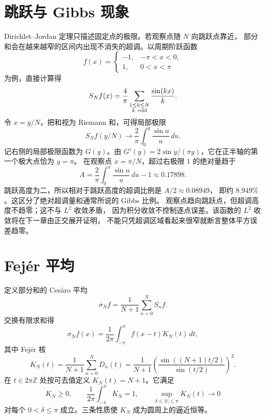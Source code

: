 \section{跳跃与 Gibbs 现象}

Dirichlet--Jordan 定理只描述固定点的极限。若观察点随 \(N\) 向跳跃点靠近，
部分和会在越来越窄的区间内出现不消失的超调。以周期阶跃函数
\[
 f(x)=\begin{cases}-1,&-\pi<x<0,\\1,&0<x<\pi\end{cases}
\]
为例，直接计算得
\[
 S_Nf(x)=\frac4\pi\sum_{\substack{1\le k\le N\\k\ {\rm odd}}}
 \frac{\sin(kx)}k.
\]
令 \(x=y/N\)，把和视为 Riemann 和，可得局部极限
\[
 S_Nf(y/N)\longrightarrow \frac2\pi\int_0^y\frac{\sin u}{u}\,du.
\]
记右侧的局部极限函数为 \(G(y)\)。由
\(G'(y)=2\sin y/(\pi y)\)，它在正半轴的第一个极大点恰为 \(y=\pi\)。
在观察点 \(x=\pi/N\)，超过右极限 \(1\) 的绝对量趋于
\[
 A=\frac2\pi\int_0^\pi\frac{\sin u}{u}\,du-1\approx0.17898.
\]
跳跃高度为二，所以相对于跳跃高度的超调比例是 \(A/2\approx0.08949\)，
即约 \(8.949\%\)。这区分了绝对超调量和通常所说的 Gibbs 比例。
观察点趋向跳跃点，但超调高度不趋零；这不与 \(L^2\) 收敛矛盾，
因为积分收敛不控制逐点误差。该函数的 \(L^2\) 收敛将在下一章由正交展开证明，
不能只凭超调区域看起来很窄就断言整体平方误差趋零。

\section{Fejér 平均}

定义部分和的 Cesàro 平均
\[
 \sigma_Nf=\frac1{N+1}\sum_{n=0}^NS_nf.
\]
交换有限求和得
\[
 \sigma_Nf(x)=\frac1{2\pi}\int_{-\pi}^{\pi}f(x-t)K_N(t)\,dt,
\]
其中 Fejér 核
\begin{equation}\label{eq:fejer-kernel}
 K_N(t)=\frac1{N+1}\sum_{n=0}^ND_n(t)
 =\frac1{N+1}\left(\frac{\sin((N+1)t/2)}{\sin(t/2)}\right)^2.
\end{equation}
在 \(t\in2\pi\mathbb Z\) 处按可去值定义 \(K_N(t)=N+1\)。它满足
\[
 K_N\ge0,\qquad \frac1{2\pi}\int_{-\pi}^{\pi}K_N=1,\qquad
 \sup_{\delta\le|t|\le\pi}K_N(t)\longrightarrow0
\]
对每个 \(0<\delta\le\pi\) 成立。三条性质使 \(K_N\) 成为圆周上的逼近恒等。

